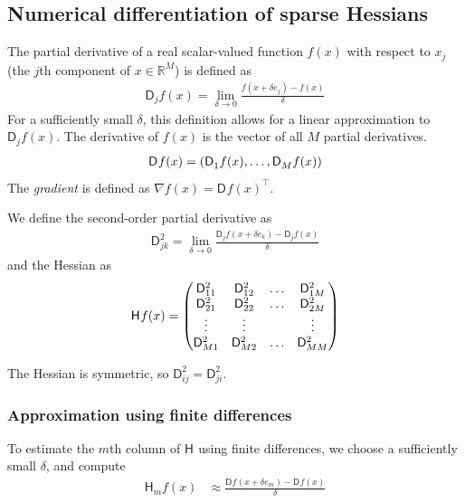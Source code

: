 \documentclass[jss]{jss}\usepackage[]{graphicx}\usepackage[]{color}
\newcommand{\parD}[3]{\mathsf{D}^{#1}_{#2}#3}
\newcommand{\hess}[2]{\mathsf{H}_{#1}#2}
\newcommand{\Real}[1]{\mathbb{R}^{#1}}
\begin{document}
\subsection[Numerical differentiation of sparse Hessians]{Numerical
  differentiation of sparse Hessians}\label{sec:numdiff}

The partial derivative of a real scalar-valued function $f(x)$ with
respect to $x_j$ (the $j$th
component of $x\in\Real{M}$) is defined as
\begin{align}
  \label{eq:defParD}
\parD{}{j}{f(x)}=\lim\limits_{\delta\to 0}\frac{f(x+\delta e_j)-f(x)}{\delta}
\end{align}
For a sufficiently small $\delta$, this definition allows for a
linear approximation to $\parD{}{j}{f(x)}$.  The derivative of $f(x)$
is the vector of all $M$ partial derivatives.
\begin{align}
  \parD{}{}{f(x)}=\left(\parD{}{1}{f(x)},\mathellipsis,\parD{}{M}{f(x)}\right)
  \end{align}
 The \emph{gradient} is defined as $\nabla f(x)=\parD{}{}{f(x)}^\top$.

We define the second-order partial derivative as
\begin{align}
  \label{eq:14}
  \parD{2}{jk}{}=\lim\limits_{\delta\to 0}\frac{\parD{}{j}{f(x+\delta e_k)}-\parD{}{j}{f(x)}}{\delta}
\end{align}
and the Hessian as
\begin{align}
  \label{eq:15}
  \hess{}{f(x)}=
  \begin{pmatrix}
    \parD{2}{11}{}&  \parD{2}{12}{}&  \mathellipsis &  \parD{2}{1M}{}\\
    \parD{2}{21}{}&  \parD{2}{22}{}&  \mathellipsis &  \parD{2}{2M}{}\\
    \vdots&\vdots&&\vdots\\
    \parD{2}{M1}{}&  \parD{2}{M2}{}&  \mathellipsis &  \parD{2}{MM}{}
    \end{pmatrix}
\end{align}

The Hessian is symmetric, so $\parD{2}{ij}{}=\parD{2}{ji}{}$.

\subsubsection[Approximation using finite differences]{Approximation using finite differences} 

To estimate the $m$th column of $\hess{}{}$ using finite differences, we choose a
sufficiently small $\delta$, and compute
\begin{align}
  \label{eq:1}
  \hess{m}{f(x)}&\approx\frac{\parD{}{}{f(x+\delta e_m)}-\parD{}{}{f(x)}}{\delta}
\end{align}
\end{document}
